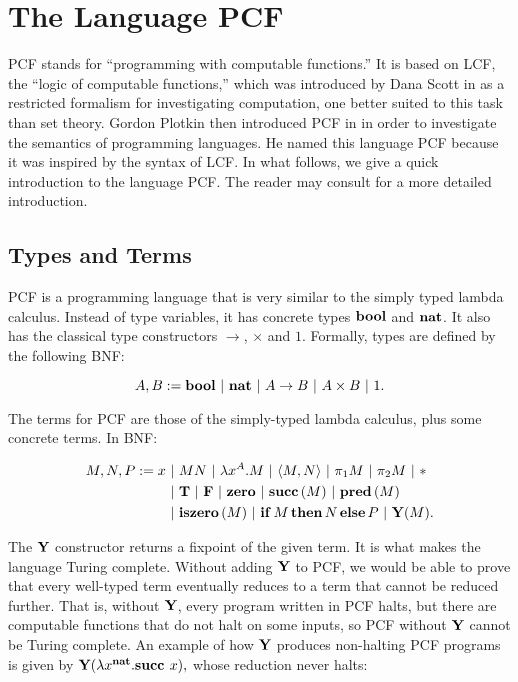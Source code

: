
\section{The Language PCF}\label{sec:pcf}

PCF stands for ``programming with computable functions.'' It is based on LCF, the ``logic of computable functions,'' which was introduced by Dana Scott in \cite{LCF} as a restricted formalism for investigating computation, one better suited to this task than set theory. Gordon Plotkin then introduced PCF in \cite{PCF} in order to investigate the semantics of programming languages. He named this language PCF because it was inspired by the syntax of LCF. In what follows, we give a quick introduction to the language PCF. The reader may consult \cite{LambdaNotes} for a more detailed introduction.

\subsection{Types and Terms}

PCF is a programming language that is very similar to the simply typed lambda calculus. Instead of type variables, it has concrete types $\mathbf{bool}$ and $\mathbf{nat}$. It also has the classical type constructors $\to$, $\times$ and $1$. Formally, types are defined by the following BNF:

\[ A, B := \mathbf{bool} \ \mathbf{|}\  \mathbf{nat} \ \mathbf{|}\  A\to B \ \mathbf{|}\  A\times B \ \mathbf{|}\  1. \]

The terms for PCF are those of the simply-typed lambda calculus, plus some concrete terms. In BNF:

\begin{align*}
    M, N, P := x &\ \mathbf{|}\  MN \ \mathbf{|}\  \lambda x^A.M \ \mathbf{|}\  \langle M, N\rangle \ \mathbf{|}\  \pi_1M \ \mathbf{|}\  \pi_2M \ \mathbf{|}\  * \\
    &\ \mathbf{|}\  \mathbf{T} \ \mathbf{|}\  \mathbf{F} \ \mathbf{|}\  \mathbf{zero} \ \mathbf{|}\  \mathbf{succ}\,(M) \ \mathbf{|}\  \mathbf{pred}\,(M) \\
    &\ \mathbf{|}\  \mathbf{iszero}\,(M) \ \mathbf{|}\  \mathbf{if}\,M\,\mathbf{then}\,N\,\mathbf{else}\,P \ \mathbf{|}\  \mathbf{Y}(M).
\end{align*}

The $\mathbf{Y}$ constructor returns a fixpoint of the given term. It is what makes the language Turing complete. Without adding $\textbf{Y}$ to PCF, we would be able to prove that every well-typed term eventually reduces to a term that cannot be reduced further. That is, without $\textbf{Y}$, every program written in PCF halts, but there are computable functions that do not halt on some inputs, so PCF without $\textbf{Y}$ cannot be Turing complete. An example of how $\textbf{Y}$ produces non-halting PCF programs is given by $\textbf{Y}(\lambda x^{\textbf{nat}}. \textbf{succ } x),$ whose reduction never halts:

